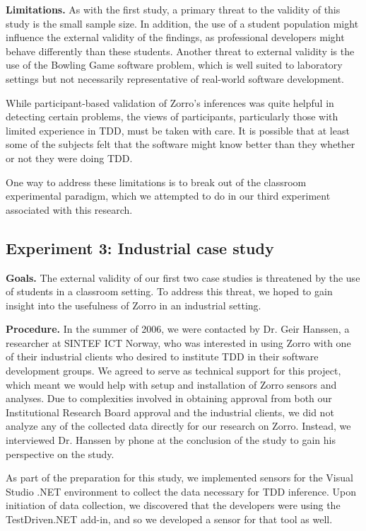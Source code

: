 \documentclass[smallextended]{svjour3}     %
\begin{document}
{\bf Limitations.}  As with the first study, a primary threat to the
validity of this study is the small sample size.  In addition, the use of a
student population might influence the external validity of the findings,
as professional developers might behave differently than these students.
Another threat to external validity is the use of the Bowling Game
software problem, which is well suited to laboratory settings but not
necessarily representative of real-world software development. 

While participant-based validation of Zorro's inferences was quite helpful
in detecting certain problems, the views of participants, particularly
those with limited experience in TDD, must be taken with care.  It is
possible that at least some of the subjects felt that the software might
know better than they whether or not they were doing TDD.  

One way to address these limitations is to break out of the classroom
experimental paradigm, which we attempted to do in our third experiment
associated with this research.

\subsection{Experiment 3: Industrial case study}

{\bf Goals.}  The external validity of our first two case studies is
threatened by the use of students in a classroom setting.  To address this
threat, we hoped to gain insight into the usefulness of Zorro in an industrial setting. 

{\bf Procedure.}  In the summer of 2006, we were contacted by Dr. Geir
Hanssen, a researcher at SINTEF ICT Norway, who was interested in using
Zorro with one of their industrial clients who desired to institute TDD in
their software development groups.  We agreed to serve as technical support
for this project, which meant we would help with setup and installation of
Zorro sensors and analyses.  Due to complexities involved in obtaining
approval from both our Institutional Research Board approval and the
industrial clients, we did not analyze any of the collected data directly
for our research on Zorro. Instead, we interviewed Dr. Hanssen by phone at
the conclusion of the study to gain his perspective on the study. 

As part of the preparation for this study, we implemented sensors for the
Visual Studio .NET environment to collect the data necessary for TDD
inference.  Upon initiation of data collection, we discovered that the
developers were using the TestDriven.NET add-in, and so we developed a
sensor for that tool as well.
\end{document}
